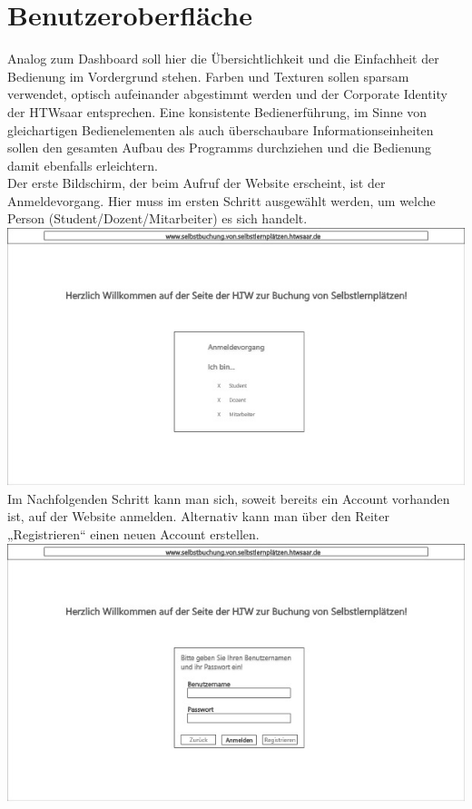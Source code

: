 \documentclass[a4paper,12pt]{article}
\begin{document}
\section{Benutzeroberfläche}
Analog zum Dashboard soll hier die Übersichtlichkeit und die Einfachheit der Bedienung im Vordergrund stehen. Farben und Texturen sollen sparsam verwendet, optisch aufeinander abgestimmt werden und der Corporate Identity der HTWsaar entsprechen. Eine konsistente Bedienerführung, im Sinne von gleichartigen Bedienelementen als auch überschaubare Informationseinheiten sollen den gesamten Aufbau des Programms durchziehen und die Bedienung damit ebenfalls erleichtern.\\ 

Der erste Bildschirm, der beim Aufruf der Website erscheint, ist der Anmeldevorgang. Hier muss im ersten Schritt ausgewählt werden, um welche Person (Student/Dozent/Mitarbeiter) es sich handelt.\\

\includegraphics{Bilder/UI1}\label{UI_1}\\

Im Nachfolgenden Schritt kann man sich, soweit bereits ein Account vorhanden ist, auf der Website anmelden. Alternativ kann man über den Reiter „Registrieren“ einen neuen Account erstellen.\\

\includegraphics{Bilder/UI2}\label{UI_2}\\
\end{document}
